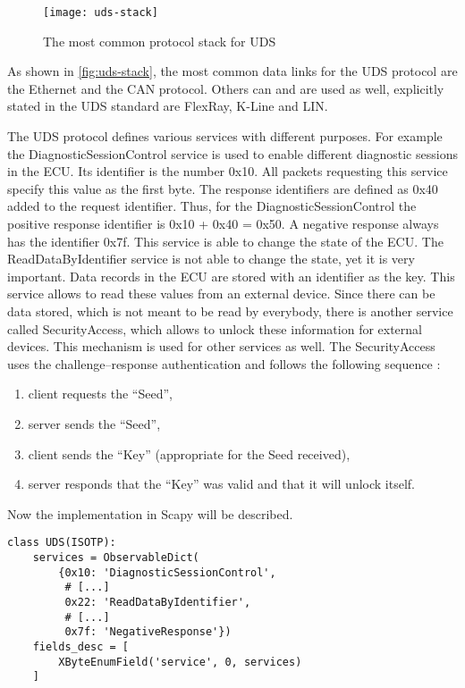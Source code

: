\begin{figure}[h]
    \centering
    \texttt{[image: uds-stack]}
    \caption{The most common protocol stack for UDS \cite{Weiss2020}}
    \label{fig:uds-stack}
\end{figure}

As shown in \autoref{fig:uds-stack}, the most common data links for the UDS protocol are the Ethernet and the CAN protocol. Others can and are used as well, explicitly stated in the UDS standard are FlexRay, K-Line and LIN.

The UDS protocol defines various services with different purposes. For example the DiagnosticSessionControl service is used to enable different diagnostic sessions in the ECU. Its identifier is the number 0x10. All packets requesting this service specify this value as the first byte. The response identifiers are defined as 0x40 added to the request identifier. Thus, for the DiagnosticSessionControl the positive response identifier is 0x10 + 0x40 = 0x50. A negative response always has the identifier 0x7f. This service is able to change the state of the ECU. The ReadDataByIdentifier service is not able to change the state, yet it is very important. Data records in the ECU are stored with an identifier as the key. This service allows to read these values from an external device. Since there can be data stored, which is not meant to be read by everybody, there is another service called SecurityAccess, which allows to unlock these information for external devices. This mechanism is used for other services as well. The SecurityAccess uses the challenge–response authentication and follows the following sequence \cite{iso14229}:

\begin{samepage}
\begin{enumerate}
  \item client requests the “Seed”,
  \item server sends the “Seed”,
  \item client sends the “Key” (appropriate for the Seed received),
  \item server responds that the “Key” was valid and that it will unlock itself.
\end{enumerate}
\end{samepage}

Now the implementation in Scapy will be described.

\begin{samepage}
\begin{verbatim}
class UDS(ISOTP):
    services = ObservableDict(
        {0x10: 'DiagnosticSessionControl',
         # [...]
         0x22: 'ReadDataByIdentifier',
         # [...]
         0x7f: 'NegativeResponse'})
    fields_desc = [
        XByteEnumField('service', 0, services)
    ]
\end{verbatim}
\end{samepage}

